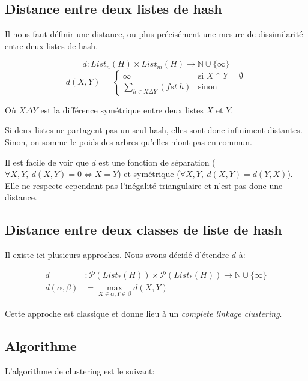 \subsection{Distance entre deux listes de hash}
Il nous faut définir une distance, ou plus précisément une mesure de dissimilarité entre deux listes de hash.

$$
d : List_n(H) \times List_m(H) \to \mathbb{N} \cup \{\infty\}
$$
\[
d (X,Y) =
\begin{cases}
	\infty & \text{si $X \cap Y = \emptyset$} \\
	\sum\limits_{h \in X \Delta Y} (fst\ h) & \text{sinon}
\end{cases}
\]

Où $X \Delta Y$ est la différence symétrique entre deux listes $X$ et $Y$.

Si deux listes ne partagent pas un seul hash, elles sont donc infiniment distantes. Sinon, on somme le poids des arbres qu'elles n'ont pas en commun.

Il est facile de voir que $d$ est une fonction de séparation ($\forall X,Y,\ d(X,Y) = 0 \iff X = Y$) et symétrique ($\forall X,Y,\ d(X,Y) = d(Y,X)$). Elle ne respecte cependant pas l'inégalité triangulaire et n'est pas donc une distance.


\subsection{Distance entre deux classes de liste de hash}
Il existe ici plusieurs approches.
Nous avons décidé d'étendre $d$ à:

\begin{align*}
d &: \mathcal{P}(List_*(H)) \times \mathcal{P}(List_*(H)) \to \mathbb{N} \cup \{\infty\}\\
d(\alpha,\beta) &= \max\limits_{X \in \alpha, Y \in \beta} d(X,Y)
\end{align*}

Cette approche est classique et donne lieu à un \emph{complete linkage clustering}.

\subsection{Algorithme}
L'algorithme de clustering est le suivant:

